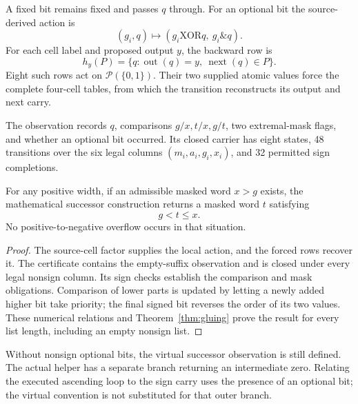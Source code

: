 A fixed bit remains fixed and passes $q$ through. For an optional bit the source-derived action is
\[
 (g_i,q)\longmapsto (g_i\mathbin{\mathrm{XOR}}q,\ g_i\mathbin{\&}q).
\]
For each cell label and proposed output $y$, the backward row is
\[
 h_y(P)=\{q:\operatorname{out}(q)=y,\ \operatorname{next}(q)\in P\}.
\]
Eight such rows act on $\mathcal P(\{0,1\})$. Their two supplied atomic values force the complete four-cell tables, from which the transition reconstructs its output and next carry.

The observation records $q$, comparisons $g/x,t/x,g/t$, two extremal-mask flags, and whether an optional bit occurred. Its closed carrier has eight states, 48 transitions over the six legal columns $(m_i,a_i,g_i,x_i)$, and 32 permitted sign completions.

\begin{samepage}
\begin{theorem}\label{thm:successor}
For any positive width, if an admissible masked word $x>g$ exists, the mathematical successor construction returns a masked word $t$ satisfying
\[
 g<t\le x.
\]
No positive-to-negative overflow occurs in that situation.
\end{theorem}
\end{samepage}
\begin{proof}
The source-cell factor supplies the local action, and the forced rows recover it. The certificate contains the empty-suffix observation and is closed under every legal nonsign column. Its sign checks establish the comparison and mask obligations. Comparison of lower parts is updated by letting a newly added higher bit take priority; the final signed bit reverses the order of its two values. These numerical relations and Theorem~\ref{thm:gluing} prove the result for every list length, including an empty nonsign list.
\end{proof}

Without nonsign optional bits, the virtual successor observation is still defined. The actual helper has a separate branch returning an intermediate zero. Relating the executed ascending loop to the sign carry uses the presence of an optional bit; the virtual convention is not substituted for that outer branch.


